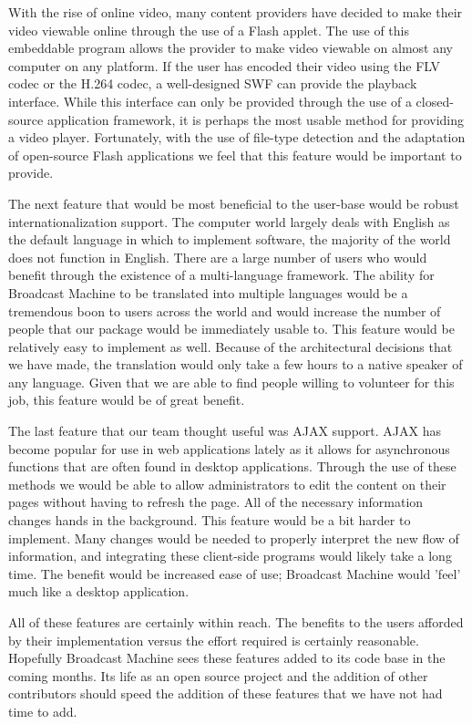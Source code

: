 \documentclass[a4paper,12pt]{report}
\begin{document}
With the rise of online video, many content providers have decided to make their video viewable online through the use of a Flash applet.
The use of this embeddable program allows the provider to make video viewable on almost any computer on any platform.
If the user has encoded their video using the FLV codec or the H.264 codec, a well-designed SWF can provide the playback interface.
While this interface can only be provided through the use of a closed-source application framework, it is perhaps the most usable method for providing a video player.
Fortunately, with the use of file-type detection and the adaptation of open-source Flash applications we feel that this feature would be important to provide.

The next feature that would be most beneficial to the user-base would be robust internationalization support.
The computer world largely deals with English as the default language in which to implement software, the majority of the world does not function in English.
There are a large number of users who would benefit through the existence of a multi-language framework.
The ability for Broadcast Machine to be translated into multiple languages would be a tremendous boon to users across the world and would increase the number of people that our package would be immediately usable to.
This feature would be relatively easy to implement as well.
Because of the architectural decisions that we have made, the translation would only take a few hours to a native speaker of any language.
Given that we are able to find people willing to volunteer for this job, this feature would be of great benefit.

The last feature that our team thought useful was AJAX support.
AJAX has become popular for use in web applications lately as it allows for asynchronous functions that are often found in desktop applications.
Through the use of these methods we would be able to allow administrators to edit the content on their pages without having to refresh the page.
All of the necessary information changes hands in the background.
This feature would be a bit harder to implement.
Many changes would be needed to properly interpret the new flow of information, and integrating these client-side programs would likely take a long time.
The benefit would be increased ease of use; Broadcast Machine would 'feel' much like a desktop application.

All of these features are certainly within reach.
The benefits to the users afforded by their implementation versus the effort required is certainly reasonable.
Hopefully Broadcast Machine sees these features added to its code base in the coming months.
Its life as an open source project and the addition of other contributors should speed the addition of these features that we have not had time to add.
 
\end{document}
